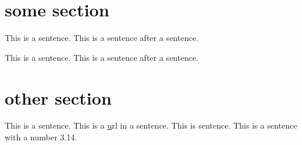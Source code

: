 
\section{some section}
\begin{something}
This is a sentence. This is a sentence after a sentence. %
\begin{else}
This is a sentence. This is a sentence after a sentence. %
\end{else}
\end{something}






\section{other section}
\begin{some stuff}
This is a sentence. This is a \href{https://url.se} url {in} a sentence.
This is sentence. This is a sentence with a number 3.14. %
\end{some stuff}
